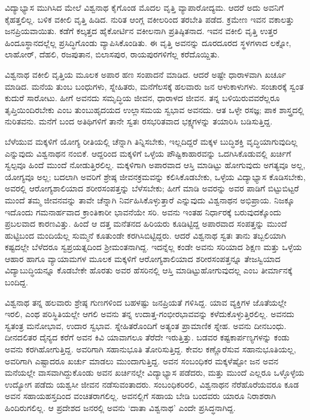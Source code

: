 ವಿದ್ಯಾಭ್ಯಾಸ ಮುಗಿಸಿದ ಮೇಲೆ ವಿಶ್ವನಾಥ ಕೈಗೊಂಡ ಮೊದಲ ವೃತ್ತಿ ವ್ಯಾಪಾರೋದ್ಯಮ. ಆದರೆ ಅದು ಅವನಿಗೆ ಕೈಹತ್ತಲಿಲ್ಲ. ಬಳಿಕ ವಕೀಲಿ ವೃತ್ತಿ ಹಿಡಿದ. ನುರಿತ ಆಂಗ್ಲ ವಕೀಲರಿಂದ ತರಬೇತಿ ಪಡೆದ. ಕ್ರಮೇಣ ಇವನ ವಕಾಲತ್ತು ಜನಪ್ರಿಯವಾಯಿತು. ಕಡೆಗೆ ಕಲ್ಕತ್ತದ ಹೈಕೋರ್ಟಿನ ವಕೀಲನಾಗಿ ಪ್ರತಿಷ್ಠಿತನಾದ. ಇವನ ವಕೀಲಿ ವೃತ್ತಿ ಉತ್ತರ ಹಿಂದೂಸ್ಥಾನದಲ್ಲೆಲ್ಲ ಪ್ರಸಿದ್ಧಿಗೊಂಡು ವ್ಯಾಪಿಸಿಕೊಂಡಿತು. ಈ ವೃತ್ತಿ ಅವನನ್ನು ದೂರದೂರದ ಸ್ಥಳಗಳಾದ ಲಕ್ನೋ, ಲಾಹೋರ್, ದೆಹಲಿ, ರಜಪುತಾನ, ಬಿಲಾಸಪುರ, ರಾಯಪುರಗಳಿಗೆಲ್ಲ ಕರೆದೊಯ್ದಿತು.

ವಿಶ್ವನಾಥ ವಕೀಲಿ ವೃತ್ತಿಯ ಮೂಲಕ ಅಪಾರ ಹಣ ಸಂಪಾದನೆ ಮಾಡಿದ. ಆದರೆ ಅಷ್ಟೇ ಧಾರಾಳವಾಗಿ ಖರ್ಚೂ ಮಾಡಿದ. ಮನೆಯ ತುಂಬ ಬಂಧುಗಳು, ಸ್ನೇಹಿತರು, ಮನೆಗೆಲಸಕ್ಕೆ ಹಲವಾರು ಜನ ಆಳುಕಾಳುಗಳು. ಸಂಚಾರಕ್ಕೆ ಸ್ವಂತ ಕುದುರೆ ಸಾರೋಟು. ಹೀಗೆ ಅವನದು ಸಮೃದ್ಧಿಯ ಜೀವನ, ಧಾರಾಳದ ಜೀವನ. ತನ್ನ ಬಳಿಯಿರುವವರೆಲ್ಲರೂ ತೃಪ್ತಿಯಿಂದಿರಬೇಕು ಎಂಬ ತುಂಬುಹೃದಯದ ಉಲ್ಲಾಸಮಯ ಸ್ವಭಾವ ಅವನದು. ಆತ ಒಳ್ಳೇ ರಸಜ್ಞ; ಪಾಕ ಶಾಸ್ತ್ರದಲ್ಲಿ ನುರಿತವನು. ಮನೆಗೆ ಬಂದ ಅತಿಥಿಗಳಿಗೆ ತಾನೇ ಸ್ವತಃ ರಸಭರಿತವಾದ ಭಕ್ಷ್ಯಗಳನ್ನು ತಯಾರಿಸಿ ಬಡಿಸುತ್ತಿದ್ದ.

ಬೆಳೆಯುವ ಮಕ್ಕಳಿಗೆ ಯೋಗ್ಯ ರೀತಿಯಲ್ಲಿ ಚೆನ್ನಾಗಿ ತಿನ್ನಿಸಬೇಕು, ಇಲ್ಲದಿದ್ದರೆ ಮಕ್ಕಳ ಬುದ್ಧಿಶಕ್ತಿ ವೃದ್ಧಿಯಾಗುವುದಿಲ್ಲ ಎನ್ನುವುದು ವಿಶ್ವನಾಥನ ನಂಬಿಕೆ. ಆದ್ದರಿಂದ ಮಕ್ಕಳಿಗೆ ಒಳ್ಳೆಯ ಪೌಷ್ಟಿಕಾಹಾರವನ್ನು ಒದಗಿಸಿಕೊಡುವಲ್ಲಿ ಖರ್ಚಿಗೆ ಸ್ವಲ್ಪವೂ ಹಿಂದೆ ಮುಂದೆ ನೋಡುತ್ತಿರಲಿಲ್ಲ. ಮಕ್ಕಳಿಗಾಗಿ ಅಪಾರವಾದ ಆಸ್ತಿ ಮಾಡಿಟ್ಟು ಹೋಗುವುದು ಅಗತ್ಯವೂ ಅಲ್ಲ, ಯೋಗ್ಯವೂ ಅಲ್ಲ; ಬದಲಾಗಿ ಅವರಿಗೆ ಶ್ರೇಷ್ಠ ಜೀವನಕ್ರಮವನ್ನು ಕಲಿಸಿಕೊಡಬೇಕು, ಒಳ್ಳೆಯ ವಿದ್ಯಾಭ್ಯಾಸ ಕೊಡಿಸಬೇಕು, ಅವರಲ್ಲಿ ಆರೋಗ್ಯಶಾಲಿಯಾದ ಶರೀರಸಂಪತ್ತನ್ನು ಬೆಳೆಸಬೇಕು; ಹೀಗೆ ಮಾಡಿ ಅವರನ್ನು ಅವರ ಪಾಡಿಗೆ ಬಿಟ್ಟುಬಿಟ್ಟರೆ ಮುಂದೆ ತಮ್ಮ ಜೀವನವನ್ನು ತಾವೇ ಚೆನ್ನಾಗಿ ನಿರ್ವಹಿಸಿಕೊಳ್ಳುತ್ತಾರೆ ಎನ್ನುವುದು ವಿಶ್ವನಾಥನ ಅಭಿಪ್ರಾಯ. ನಿಜಕ್ಕೂ ಇದೊಂದು ಗಮನಾರ್ಹವಾದ ಕ್ರಾಂತಿಕಾರೀ ಭಾವನೆಯೇ ಸರಿ. ಅವನು ಇಂತಹ ನಿರ್ಧಾರಕ್ಕೆ ಬರುವುದಕ್ಕೊಂದು ಪ್ರಬಲವಾದ ಕಾರಣವಿತ್ತು. ಹಿಂದೆ ಆ ದತ್ತ ಮನೆತನದ ಹಿರಿಯರು ಕೂಡಿಟ್ಟಿದ್ದ ಅಪಾರವಾದ ಸಂಪತ್ತನ್ನು ಮುಂದೆ ಹುಟ್ಟಿಬಂದ ಮಂದಿಯೆಲ್ಲ ಸುಮ್ಮನೆ ಕೂತುಂಡೇ ಕರಗಿಸಿಬಿಟ್ಟಿದ್ದರು. ಆದರೆ ವಿಶ್ವನಾಥ ಸ್ವತಃ ತಾನು ತಬ್ಬಲಿಯಾಗಿ ಕಷ್ಟದಲ್ಲೇ ಬೆಳೆದರೂ ಸ್ವಪ್ರಯತ್ನದಿಂದ ಶ್ರೀಮಂತನಾಗಿದ್ದ. ಇದನ್ನೆಲ್ಲ ಕಂಡೇ ಅವನು ಸರಿಯಾದ ಶಿಕ್ಷಣ ಮತ್ತು ಒಳ್ಳೆಯ ಆಹಾರ ಹಾಗೂ ವ್ಯಾಯಾಮಗಳ ಮೂಲಕ ಮಕ್ಕಳಿಗೆ ಆರೋಗ್ಯಶಾಲಿಯಾದ ಶರೀರಸಂಪತ್ತನ್ನೂ ತೇಜಸ್ವಿಯಾದ ವಿದ್ಯಾಬುದ್ಧಿಯನ್ನೂ ಕೊಡಬೇಕೇ ಹೊರತು ಅವರ ಹೆಸರಿನಲ್ಲಿ ಆಸ್ತಿ ಮಾಡಿಟ್ಟುಹೋಗುವುದಲ್ಲ ಎಂಬ ತೀರ್ಮಾನಕ್ಕೆ ಬಂದಿದ್ದ.

ವಿಶ್ವನಾಥ ತನ್ನ ಹಲವಾರು ಶ್ರೇಷ್ಠ ಗುಣಗಳಿಂದ ಬಹಳಷ್ಟು ಜನಪ್ರಿಯತೆ ಗಳಿಸಿದ್ದ. ಯಾವ ವ್ಯಕ್ತಿಗಳ ಜೊತೆಯಲ್ಲೇ ಇರಲಿ, ಎಂಥ ಪರಿಸ್ಥಿತಿಯಲ್ಲೇ ಆಗಲಿ ಅವನು ತನ್ನ ಉದಾತ್ತ-ಗಂಭೀರಭಾವವನ್ನು ಕಳೆದುಕೊಳ್ಳುತ್ತಿರಲಿಲ್ಲ. ಅವನದು ಸ್ವತಂತ್ರ ಮನೋಭಾವ, ಉದಾರ ಸ್ವಭಾವ. ಸ್ನೇಹಿತರೊಂದಿಗೆ ಅತ್ಯಂತ ಪ್ರಾಮಾಣಿಕ ಸ್ನೇಹ. ಅವನು ದೀನಬಂಧು. ದೀನದಲಿತರ ದೈನ್ಯದ ಕರೆಗೆ ಅವನ ಕಿವಿ ಯಾವಾಗಲೂ ತೆರೆದೇ ಇರುತ್ತಿತ್ತು. ಬಡವರ ಕಷ್ಟಕಾರ್ಪಣ್ಯಗಳನ್ನು ಕಂಡು ಅವನು ಕರಗಿಹೋಗುತ್ತಿದ್ದ. ಅವರಿಗಾಗಿ ಸಹಾನುಭೂತಿ ತೋರಿಸುತ್ತಿದ್ದ. ಕೇವಲ ಕಣ್ಣೊರೆಸುವ ಸಹಾನುಭೂತಿಯಲ್ಲ, ಅವರಿಗಾಗಿ ಎಷ್ಟಾದರೂ ಖರ್ಚು ಮಾಡಲು ಮುಂದಾಗುತ್ತಿದ್ದ. ಅವನ ಸಂಬಂಧಿಕರ ಮಕ್ಕಳೆಷ್ಟೋ ಜನ ಅವನ ಮನೆಯಲ್ಲೇ ವಾಸವಾಗಿದ್ದುಕೊಂಡು ಅವನ ಖರ್ಚಿನಲ್ಲೇ ವಿದ್ಯಾಭ್ಯಾಸ ಪಡೆದರು, ಮತ್ತು ಮುಂದೆ ಎಲ್ಲರೂ ಒಳ್ಳೊಳ್ಳೆಯ ಉದ್ಯೋಗ ಪಡೆದು ಯಶ್ವಸೀ ಜೀವನ ನಡೆಸುವಂತಾದರು. ಸಂಬಂಧಿಕರಿರಲಿ, ವಿಶ್ವನಾಥನ ನೆರೆಹೊರೆಯವರೂ ಕೂಡ ಅವನ ಸಹಾಯಹಸ್ತದಿಂದ ವಂಚಿತರಾಗಲಿಲ್ಲ. ಅವನಲ್ಲಿಗೆ ಸಹಾಯ ಬೇಡಿ ಬಂದವರು ಯಾರೂ ನಿರಾಶರಾಗಿ ಹಿಂದಿರುಗಲಿಲ್ಲ. ಆ ಪ್ರದೇಶದ ಜನರಲ್ಲಿ ಅವನು ‘ದಾತಾ ವಿಶ್ವನಾಥ’ ಎಂದೇ ಪ್ರಸಿದ್ಧನಾಗಿದ್ದ.

